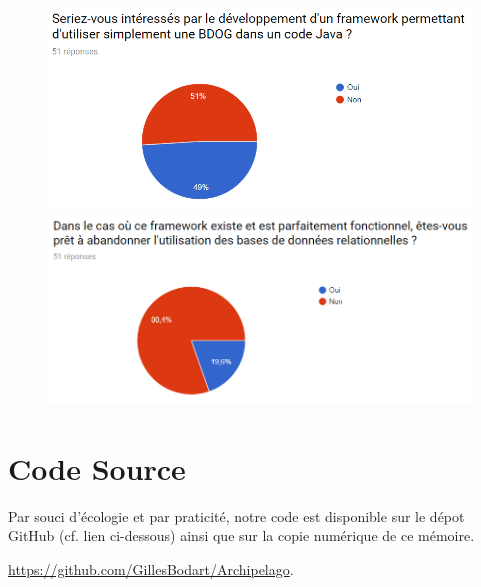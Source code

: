 \documentclass[a4paper,fleqn,12pt,oneside]{book}
\begin{document}
\begin{figure}[htp]
\centering
    \includegraphics[width=.45\textwidth]{figures/11.png}\quad
    \includegraphics[width=.45\textwidth]{figures/12.png}
\end{figure}


\chapter*{Code Source}

Par souci d'écologie et par praticité, notre code est disponible sur le dépot GitHub (cf. lien ci-dessous) ainsi que sur la copie numérique de ce mémoire.

 \url{https://github.com/GillesBodart/Archipelago}. 
%

 
\end{document}
